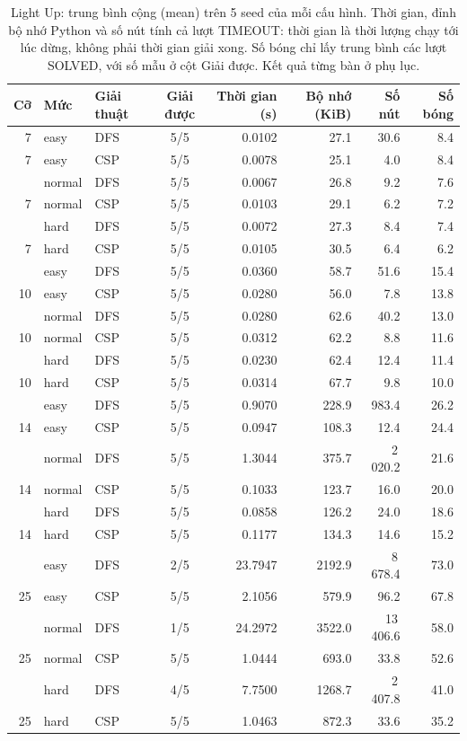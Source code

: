 \begin{table}[H]
\centering\scriptsize
\setlength{\tabcolsep}{4pt}
\begin{tabular}{@{}rllcrrrr@{}}
\toprule
Cỡ & Mức & Giải thuật & Giải được & Thời gian (s) & Bộ nhớ (KiB) & Số nút & Số bóng\\
\midrule
7 & easy & DFS & 5/5 & 0.0102 & 27.1 & 30.6 & 8.4\\
7 & easy & CSP & 5/5 & 0.0078 & 25.1 & 4.0 & 8.4\\
\addlinespace[2pt]
7 & normal & DFS & 5/5 & 0.0067 & 26.8 & 9.2 & 7.6\\
7 & normal & CSP & 5/5 & 0.0103 & 29.1 & 6.2 & 7.2\\
\addlinespace[2pt]
7 & hard & DFS & 5/5 & 0.0072 & 27.3 & 8.4 & 7.4\\
7 & hard & CSP & 5/5 & 0.0105 & 30.5 & 6.4 & 6.2\\
\addlinespace[2pt]
10 & easy & DFS & 5/5 & 0.0360 & 58.7 & 51.6 & 15.4\\
10 & easy & CSP & 5/5 & 0.0280 & 56.0 & 7.8 & 13.8\\
\addlinespace[2pt]
10 & normal & DFS & 5/5 & 0.0280 & 62.6 & 40.2 & 13.0\\
10 & normal & CSP & 5/5 & 0.0312 & 62.2 & 8.8 & 11.6\\
\addlinespace[2pt]
10 & hard & DFS & 5/5 & 0.0230 & 62.4 & 12.4 & 11.4\\
10 & hard & CSP & 5/5 & 0.0314 & 67.7 & 9.8 & 10.0\\
\addlinespace[2pt]
14 & easy & DFS & 5/5 & 0.9070 & 228.9 & 983.4 & 26.2\\
14 & easy & CSP & 5/5 & 0.0947 & 108.3 & 12.4 & 24.4\\
\addlinespace[2pt]
14 & normal & DFS & 5/5 & 1.3044 & 375.7 & 2\,020.2 & 21.6\\
14 & normal & CSP & 5/5 & 0.1033 & 123.7 & 16.0 & 20.0\\
\addlinespace[2pt]
14 & hard & DFS & 5/5 & 0.0858 & 126.2 & 24.0 & 18.6\\
14 & hard & CSP & 5/5 & 0.1177 & 134.3 & 14.6 & 15.2\\
\addlinespace[2pt]
25 & easy & DFS & 2/5 & 23.7947 & 2192.9 & 8\,678.4 & 73.0\\
25 & easy & CSP & 5/5 & 2.1056 & 579.9 & 96.2 & 67.8\\
\addlinespace[2pt]
25 & normal & DFS & 1/5 & 24.2972 & 3522.0 & 13\,406.6 & 58.0\\
25 & normal & CSP & 5/5 & 1.0444 & 693.0 & 33.8 & 52.6\\
\addlinespace[2pt]
25 & hard & DFS & 4/5 & 7.7500 & 1268.7 & 2\,407.8 & 41.0\\
25 & hard & CSP & 5/5 & 1.0463 & 872.3 & 33.6 & 35.2\\
\bottomrule
\end{tabular}
\caption{Light Up: trung bình cộng (mean) trên 5 seed của mỗi cấu hình.
Thời gian, đỉnh bộ nhớ Python và số nút tính cả lượt TIMEOUT: thời gian là
thời lượng chạy tới lúc dừng, không phải thời gian giải xong. Số bóng chỉ lấy
trung bình các lượt SOLVED, với số mẫu ở cột Giải được. Kết quả từng bàn ở phụ lục.}
\label{tab:lightup-dfs-csp-vi}
\end{table}


